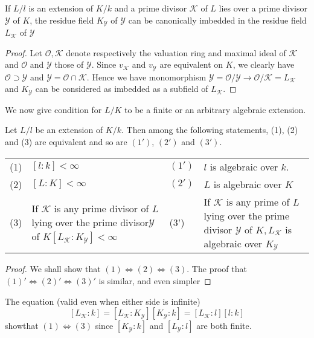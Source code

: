 \begin{lemma*}%
  If $L/l$ is an extension of $K/k$ and a prime divisor $\mathscr{K}$
  of $L$ lies over a prime divisor $\mathscr{Y}$ of $K$, the residue
  field $K_\mathscr{Y}$ of $\mathscr{Y}$ can be canonically imbedded
  in the residue field $L_\mathscr{K}$ of $\mathscr{Y}$ 
\end{lemma*}

\begin{proof}
  Let $\mathscr{O},\mathscr{K}$ denote respectively the valuation ring
  and maximal ideal of $\mathscr{K}$ and $\mathscr{O}$ and
  $\mathscr{Y}$ those of $\mathscr{Y}$. Since $v_\mathscr{K}$ and
  $v_\mathscr{Y}$ are equivalent on $K$, we clearly have
  $\mathscr{O}\supset \mathscr{Y}$ and $\mathscr{Y}=\mathscr{O} \cap
  \mathscr{K}$. Hence we have monomorphism
  $\mathscr{Y}=\mathscr{O}/\mathscr{Y} \to
  \mathscr{O}/\mathscr{K}=L_\mathscr{K}$ and $K_\mathscr{Y}$ can be
  considered as imbedded as a subfield of $L_\mathscr{K}$. 
\end{proof}

We now give condition for $L/K$ to be a finite or an arbitrary
algebraic extension. 

\begin{lemma*}%
  Let $L/l$ be an extension of $K/k$. Then among the following
  statements, (1), (2) and (3) are equivalent and so are
  $(1')$, $(2')$ and $(3')$. 
\end{lemma*}
\noindent 
\begin{tabular}{lp{4cm}lp{4cm}}
  (1)& $[l:k]<\infty$ & $(1')$& $l$ is algebraic over $k$.\\
  (2)& $[L:K]< \infty$ & $(2')$ & $L$ is algebraic over $K$\\
  (3)& If $\mathscr{K}$ is any prime divisor of $L$ lying over the
  prime divisor\hfill\break   $\mathscr{Y}$ of $K[L_\mathscr{K}:K_\mathscr{Y}]<
  \infty$ &  (3') & If $\mathscr{K}$ is any prime of $L$ 
  lying over the prime divisor $\mathscr{Y}$ 
  of  $K,L _\mathscr{K}$ is algebraic over $K_\mathscr{Y}$ 
\end{tabular}

\begin{proof}
  We shall show that $(1)\Leftrightarrow (2)\Leftrightarrow(3)$. The
  proof that $(1)'\Leftrightarrow (2)'\Leftrightarrow (3)'$ is
  similar, and even simpler 
\end{proof}

The equation (valid even when either side is infinite)
$$
[L_\mathscr{K}:k]=[L_\mathscr{K}:K_\mathscr{Y}][K_\mathscr{Y}:k] =
[L_\mathscr{K}:l][l:k]  
$$
show\pageoriginale that $(1)\Leftrightarrow (3)$ since $[K_\mathscr{Y}:k]$ and
  $[L_\mathscr{Y}:l]$ are both finite. 

